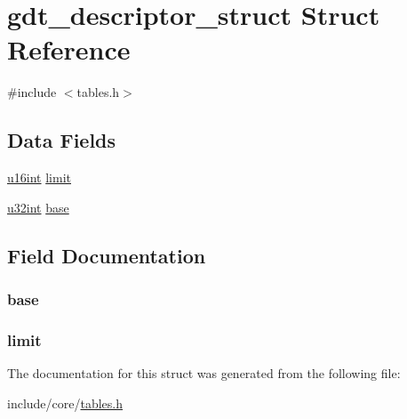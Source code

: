 \hypertarget{structgdt__descriptor__struct}{}\section{gdt\+\_\+descriptor\+\_\+struct Struct Reference}
\label{structgdt__descriptor__struct}


{\ttfamily \#include $<$tables.\+h$>$}

\subsection*{Data Fields}
\begin{DoxyCompactItemize}
\item 
\hyperlink{system_8h_a863d9497073aad2b991aeab2211d87af}{u16int} \hyperlink{structgdt__descriptor__struct_a68fd3b4f6c14a331ca9b226cbf122e13}{limit}
\item 
\hyperlink{system_8h_a757de76cafbcddaac0d1632902fe4cb8}{u32int} \hyperlink{structgdt__descriptor__struct_ab5763c2b18c825c8b8fba44b2e60ddc1}{base}
\end{DoxyCompactItemize}


\subsection{Field Documentation}
\subsubsection[{\texorpdfstring{base}{base}}]{ base}\hypertarget{structgdt__descriptor__struct_ab5763c2b18c825c8b8fba44b2e60ddc1}{}\label{structgdt__descriptor__struct_ab5763c2b18c825c8b8fba44b2e60ddc1}
\subsubsection[{\texorpdfstring{limit}{limit}}]{ limit}\hypertarget{structgdt__descriptor__struct_a68fd3b4f6c14a331ca9b226cbf122e13}{}\label{structgdt__descriptor__struct_a68fd3b4f6c14a331ca9b226cbf122e13}


The documentation for this struct was generated from the following file\+:\begin{DoxyCompactItemize}
\item 
include/core/\hyperlink{tables_8h}{tables.\+h}\end{DoxyCompactItemize}
